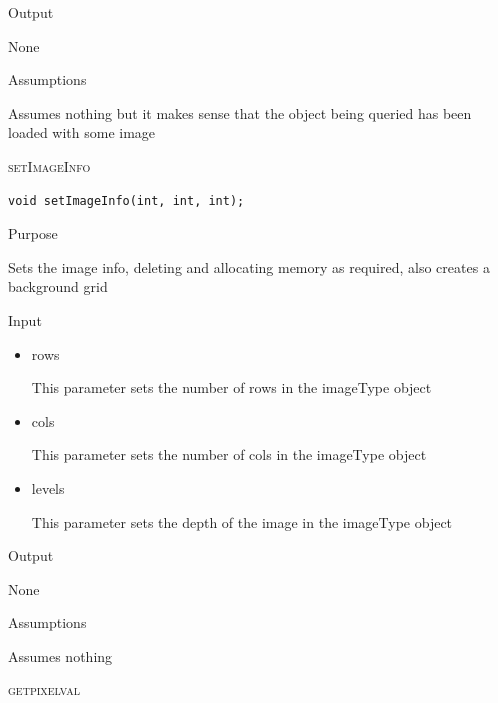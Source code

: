 \documentclass[pdftex, 11pt]{article}
\begin{document}
\begin{description}
\begin{description}
			\item{Output}

				None

			\item{Assumptions}

				Assumes nothing but it makes sense that the object being
				queried has been loaded with some image



		\end{description}


	\item{\textsc{setImageInfo}}
		\begin{description}

\begin{lstlisting}
void setImageInfo(int, int, int);
\end{lstlisting}

			\item{Purpose}
			
				Sets the image info, deleting and allocating memory
				as required, also creates a background grid

			\item{Input}

				\begin{itemize}
					\item{rows}

						This parameter sets the number of rows
						in the imageType object

					\item{cols}

						This parameter sets the number of cols
						in the imageType object

					\item{levels}

						This parameter sets the depth of the
						image in the imageType object

				\end{itemize}

			\item{Output}

				None

			\item{Assumptions}

				Assumes nothing

		\end{description}




	\item{\textsc{getpixelval}}
		\begin{description}


\end{description}
\end{description}
\end{document}
